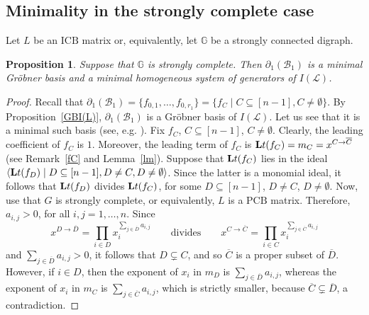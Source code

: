 \documentclass[10pt]{amsart}
\newcommand{\eg}{e.g.}
\newcommand{\mbg}{\mbox{$\mathbb{G}$}}
\newcommand{\lt}{\mbox{${\bf L}{\rm t}$}}
\newcommand{\mcb}{\mbox{$\mathcal{B}$}}
\newcommand{\mcl}{\mbox{$\mathcal{L}$}}
\newcommand{\icb}{\mbox{$\mathrm{ICB}$}}
\newcommand{\pcb}{\mbox{$\mathrm{PCB}$}}
\newcommand{\dif}{\mbox{$\partial$}}
\newtheorem{proposition}[cdrthm]{Proposition}
\theoremstyle{definition}
\theoremstyle{remark}
\begin{document}
\subsection{Minimality in the strongly complete case}

 Let $L$ be an $\icb$ matrix or, equivalently, let $\mbg$ be
a strongly connected digraph.

\begin{proposition}\label{minGB}
Suppose that $\mbg$ is strongly complete. Then $\dif_1(\mcb_1)$ is a
minimal Gr\"obner basis and a minimal homogeneous system of generators
of $I(\mcl)$.
\end{proposition}
\begin{proof}
Recall that $\dif_1(\mcb_1)=\{f_{0,1},\ldots ,f_{0,r_1}\}=\{f_C\mid
C\subseteq [n-1], C\neq\emptyset \}$. By Proposition~\ref{GBI(L)},
$\dif_1(\mcb_1)$ is a Gr\"obner basis of $I(\mcl)$. Let us see that it
is a minimal such basis (see, \eg
\cite[\S~2.7. Definition~4]{clo}). Fix $f_C$, $C\subseteq [n-1]$,
$C\neq\emptyset$. Clearly, the leading coefficient of $f_C$ is
$1$. Moreover, the leading term of $f_C$ is
$\lt(f_C)=m_C=x^{C\to\overline{C}}$ (see Remark~\ref{fC} and
Lemma~\ref{lm}). Suppose that $\lt(f_C)$ lies in the ideal
$\langle\lt(f_D)\mid D\subseteq [n-1], D\neq C, D\neq
\emptyset\rangle$. Since the latter is a monomial ideal, it follows
that $\lt(f_D)$ divides $\lt(f_C)$, for some $D\subseteq [n-1]$,
$D\neq C$, $D\neq\emptyset$. Now, use that $G$ is strongly complete,
or equivalently, $L$ is a $\pcb$ matrix. Therefore, $a_{i,j}>0$, for
all $i,j=1,\ldots ,n$. Since
\[
x^{D\to\overline{D}}=\prod_{i\in
  D}x_i^{\sum_{j\in\overline{D}}a_{i,j}}\qquad\text{divides}\qquad
x^{C\to\overline{C}}=\prod_{i\in
  C}x_i^{\sum_{j\in\overline{C}}a_{i,j}}
\]
and $\sum_{j\in\overline{D}}a_{i,j}>0$, it follows that $D\subsetneq C$,
and so $\overline{C}$ is a proper subset of $\overline{D}$. However,
if $i\in D$, then the exponent of $x_i$ in $m_D$ is
$\sum_{j\in\overline{D}}a_{i,j}$, whereas the exponent of $x_i$ in
$m_C$ is $\sum_{j\in\overline{C}}a_{i,j}$, which is strictly smaller,
because $\overline{C}\subsetneq \overline{D}$, a contradiction.


\end{proof}
\end{document}
